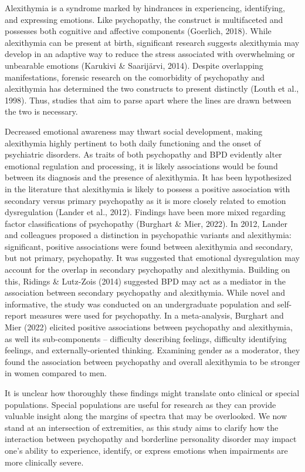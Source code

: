 \documentclass[
  man,floatsintext]{apa7}
\begin{document}
Alexithymia is a syndrome marked by hindrances in experiencing, identifying, and expressing emotions. Like psychopathy, the construct is multifaceted and possesses both cognitive and affective components (Goerlich, 2018). While alexithymia can be present at birth, significant research suggests alexithymia may develop in an adaptive way to reduce the stress associated with overwhelming or unbearable emotions (Karukivi \& Saarijärvi, 2014). Despite overlapping manifestations, forensic research on the comorbidity of psychopathy and alexithymia has determined the two constructs to present distinctly (Louth et al., 1998). Thus, studies that aim to parse apart where the lines are drawn between the two is necessary.

Decreased emotional awareness may thwart social development, making alexithymia highly pertinent to both daily functioning and the onset of psychiatric disorders. As traits of both psychopathy and BPD evidently alter emotional regulation and processing, it is likely associations would be found between its diagnosis and the presence of alexithymia. It has been hypothesized in the literature that alexithymia is likely to possess a positive association with secondary versus primary psychopathy as it is more closely related to emotion dysregulation (Lander et al., 2012). Findings have been more mixed regarding factor classifications of psychopathy (Burghart \& Mier, 2022). In 2012, Lander and colleagues proposed a distinction in psychopathic variants and alexithymia: significant, positive associations were found between alexithymia and secondary, but not primary, psychopathy. It was suggested that emotional dysregulation may account for the overlap in secondary psychopathy and alexithymia. Building on this, Ridings \& Lutz-Zois (2014) suggested BPD may act as a mediator in the association between secondary psychopathy and alexithymia. While novel and informative, the study was conducted on an undergraduate population and self-report measures were used for psychopathy. In a meta-analysis, Burghart and Mier (2022) elicited positive associations between psychopathy and alexithymia, as well its sub-components -- difficulty describing feelings, difficulty identifying feelings, and externally-oriented thinking. Examining gender as a moderator, they found the association between psychopathy and overall alexithymia to be stronger in women compared to men.

It is unclear how thoroughly these findings might translate onto clinical or special populations. Special populations are useful for research as they can provide valuable insight along the margins of spectra that may be overlooked. We now stand at an intersection of extremities, as this study aims to clarify how the interaction between psychopathy and borderline personality disorder may impact one's ability to experience, identify, or express emotions when impairments are more clinically severe.
\end{document}
